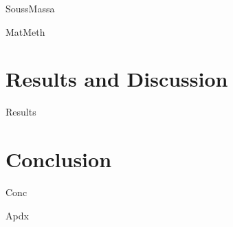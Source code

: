 \documentclass[a4paper, 12pt, bibliography=totoc, parskip=half, numbers=noenddot, twoside=true, open=right,headings=twolinechapter]{scrreprt}
\begin{document}
{SoussMassa}


{MatMeth}

\chapter{Results and Discussion}
\label{Chap-Results}

{Results}

\chapter{Conclusion}
\label{Chap-Conc}

{Conc}

\printbibliography

\appendix
\label{Chap-Appendix}

{Apdx}
\end{document}

